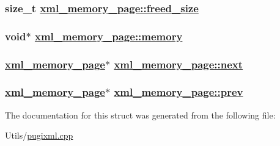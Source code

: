 \hypertarget{structxml__memory__page_b4c29645546530a0e1938b53979890a8}{
\subsubsection[freed\_\-size]{\setlength{\rightskip}{0pt plus 5cm}size\_\-t \hyperlink{structxml__memory__page_b4c29645546530a0e1938b53979890a8}{xml\_\-memory\_\-page::freed\_\-size}}}
\label{structxml__memory__page_b4c29645546530a0e1938b53979890a8}


\hypertarget{structxml__memory__page_b51315db80e7f2a5afb87c56fedcd734}{
\subsubsection[memory]{\setlength{\rightskip}{0pt plus 5cm}void$\ast$ \hyperlink{structxml__memory__page_b51315db80e7f2a5afb87c56fedcd734}{xml\_\-memory\_\-page::memory}}}
\label{structxml__memory__page_b51315db80e7f2a5afb87c56fedcd734}


\hypertarget{structxml__memory__page_326a74e009af80219ea31bc65ed9e45e}{
\subsubsection[next]{\setlength{\rightskip}{0pt plus 5cm}\hyperlink{structxml__memory__page}{xml\_\-memory\_\-page}$\ast$ \hyperlink{structxml__memory__page_326a74e009af80219ea31bc65ed9e45e}{xml\_\-memory\_\-page::next}}}
\label{structxml__memory__page_326a74e009af80219ea31bc65ed9e45e}


\hypertarget{structxml__memory__page_014969b0e4a34a6cb24e9823791e60ab}{
\subsubsection[prev]{\setlength{\rightskip}{0pt plus 5cm}\hyperlink{structxml__memory__page}{xml\_\-memory\_\-page}$\ast$ \hyperlink{structxml__memory__page_014969b0e4a34a6cb24e9823791e60ab}{xml\_\-memory\_\-page::prev}}}
\label{structxml__memory__page_014969b0e4a34a6cb24e9823791e60ab}




The documentation for this struct was generated from the following file:\begin{CompactItemize}
\item 
Utils/\hyperlink{pugixml_8cpp}{pugixml.cpp}\end{CompactItemize}
